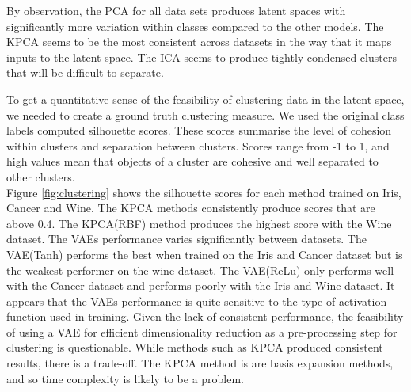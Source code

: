 \documentclass[12pt]{article}
\begin{document}
By observation, the PCA for all data sets produces latent spaces with significantly more variation within classes compared to the other models. The KPCA seems to be the most consistent across datasets in the way that it maps inputs to the latent space. The ICA seems to produce tightly condensed clusters that will be difficult to separate.

To get a quantitative sense of the feasibility of clustering data in the latent space, we needed to create a ground truth clustering measure. We used the original class labels computed silhouette scores. These scores summarise the level of cohesion within clusters and separation between clusters. Scores range from -1 to 1, and high values mean that objects of a cluster are cohesive and well separated to other clusters.\\

Figure \ref{fig:clustering} shows the silhouette scores for each method trained on Iris, Cancer and Wine. The KPCA methods consistently produce scores that are above 0.4. The KPCA(RBF) method produces the highest score with the Wine dataset. The VAEs performance varies significantly between datasets. The VAE(Tanh) performs the best when trained on the Iris and Cancer dataset but is the weakest performer on the wine dataset. The VAE(ReLu) only performs well with the Cancer dataset and performs poorly with the Iris and Wine dataset. It appears that the VAEs performance is quite sensitive to the type of activation function used in training. Given the lack of consistent performance, the feasibility of using a VAE for efficient dimensionality reduction as a pre-processing step for clustering is questionable. While methods such as KPCA produced consistent results, there is a trade-off. The KPCA method is are basis expansion methods, and so time complexity is likely to be a problem.

\end{document}
